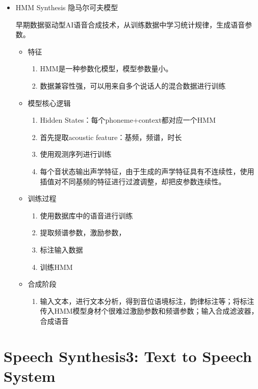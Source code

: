 \documentclass[UTF8]{ctexart}
\begin{document}
\begin{itemize}
    \item HMM Synthesis 隐马尔可夫模型
    
    早期数据驱动型AI语音合成技术，从训练数据中学习统计规律，生成语音参数。
    \begin{itemize}
        \item 特征
        \begin{enumerate}
            \item HMM是一种参数化模型，模型参数量小。
            \item 数据兼容性强，可以用来自多个说话人的混合数据进行训练
        \end{enumerate}
        \item 模型核心逻辑
        \begin{enumerate}
            \item Hidden States：每个phoneme+context都对应一个HMM
            \item 首先提取acoustic feature：基频，频谱，时长
            \item 使用观测序列进行训练
            \item 每个音状态输出声学特征，由于生成的声学特征具有不连续性，使用插值对不同基频的特征进行过渡调整，却把皮参数连续性。
        \end{enumerate}
        \item 训练过程
        \begin{enumerate}
            \item 使用数据库中的语音进行训练
            \item 提取频谱参数，激励参数，
            \item 标注输入数据
            \item 训练HMM
        \end{enumerate}
        \item 合成阶段
        \begin{enumerate}
            \item 输入文本，进行文本分析，得到音位语境标注，韵律标注等；将标注传入HMM模型身材个很难过激励参数和频谱参数；输入合成滤波器，合成语音
        \end{enumerate}
    \end{itemize}
\end{itemize}

\section{Speech Synthesis3: Text to Speech System}
\end{document}
